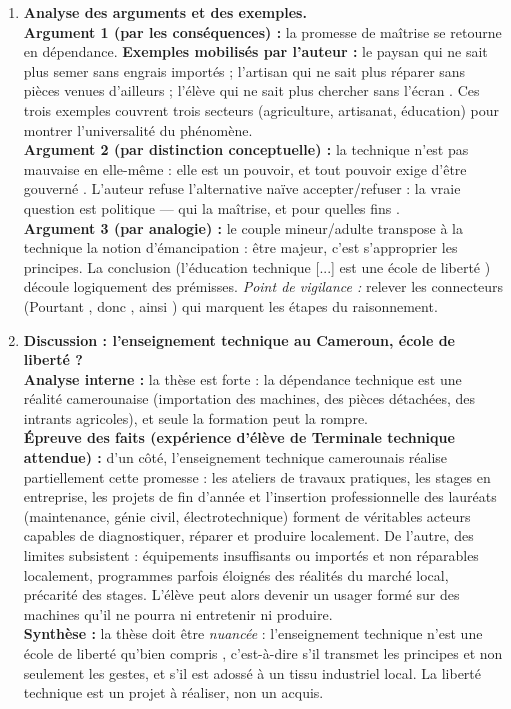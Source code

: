 \documentclass[11pt]{article}
\begin{document}
\begin{exoresolu}
\begin{enumerate}
\item \textbf{Analyse des arguments et des exemples.}\\
\textbf{Argument 1 (par les conséquences) :} la promesse de maîtrise se retourne en dépendance. \textbf{Exemples mobilisés par l'auteur :} le paysan qui \og ne sait plus semer sans engrais importés \fg ; l'artisan qui \og ne sait plus réparer sans pièces venues d'ailleurs \fg ; l'élève qui \og ne sait plus chercher sans l'écran \fg. Ces trois exemples couvrent trois secteurs (agriculture, artisanat, éducation) pour montrer l'universalité du phénomène.\\
\textbf{Argument 2 (par distinction conceptuelle) :} \og la technique n'est pas mauvaise en elle-même : elle est un pouvoir, et tout pouvoir exige d'être gouverné \fg. L'auteur refuse l'alternative naïve accepter/refuser : la vraie question est politique — \og qui la maîtrise, et pour quelles fins \fg.\\
\textbf{Argument 3 (par analogie) :} le couple mineur/adulte transpose à la technique la notion d'émancipation : être majeur, c'est s'approprier les principes. La conclusion (\og l'éducation technique [...] est une école de liberté \fg) découle logiquement des prémisses. \emph{Point de vigilance :} relever les connecteurs (\og Pourtant \fg, \og donc \fg, \og ainsi \fg) qui marquent les étapes du raisonnement.

\item \textbf{Discussion : l'enseignement technique au Cameroun, \og école de liberté \fg ?}\\
\textbf{Analyse interne :} la thèse est forte : la dépendance technique est une réalité camerounaise (importation des machines, des pièces détachées, des intrants agricoles), et seule la formation peut la rompre.\\
\textbf{Épreuve des faits (expérience d'élève de Terminale technique attendue) :} d'un côté, l'enseignement technique camerounais réalise partiellement cette promesse : les ateliers de travaux pratiques, les stages en entreprise, les projets de fin d'année et l'insertion professionnelle des lauréats (maintenance, génie civil, électrotechnique) forment de véritables acteurs capables de diagnostiquer, réparer et produire localement. De l'autre, des limites subsistent : équipements insuffisants ou importés et non réparables localement, programmes parfois éloignés des réalités du marché local, précarité des stages. L'élève peut alors devenir un usager formé sur des machines qu'il ne pourra ni entretenir ni produire.\\
\textbf{Synthèse :} la thèse doit être \emph{nuancée} : l'enseignement technique n'est une école de liberté qu'\og bien compris \fg, c'est-à-dire s'il transmet les principes et non seulement les gestes, et s'il est adossé à un tissu industriel local. La liberté technique est un projet à réaliser, non un acquis.


\end{enumerate}
\end{exoresolu}
\end{document}
